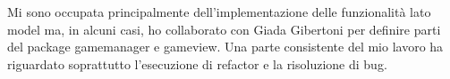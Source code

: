 Mi sono occupata principalmente dell'implementazione delle funzionalità lato model ma, in alcuni casi, ho collaborato con Giada Gibertoni per definire parti del package gamemanager e gameview.
Una parte consistente del mio lavoro ha riguardato soprattutto l'esecuzione di refactor e la risoluzione di bug.